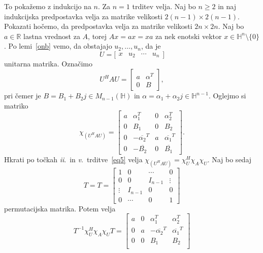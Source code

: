 \documentclass[mat1, tisk]{fmfdelo}
\numberwithin{equation}{section}
\begin{document}
\begin{dokaz}
    \medskip
    To pokažemo z indukcijo na $n$. Za $n = 1$ trditev velja. Naj bo $n \geq 2$ in naj indukcijska predpostavka velja za matrike velikosti $2(n-1) \times 2(n-1)$. Pokazati hočemo, da 
    predpostavka velja za matrike velikosti $2n \times 2n$. Naj bo $a \in \mathbb{R}$ lastna vrednost za $A$, torej
    $Ax = ax = xa$ za nek enotski vektor $x\in \mathbb{H}^n \setminus \{0\}$. Po lemi~\ref{onb} vemo, da obstajajo $u_2, \ldots , u_n$, da je
    $$U =
    \Bigg[\begin{matrix}
        x & u_2 & \cdots & u_n
    \end{matrix}\Bigg]
    $$
    unitarna matrika. Označimo
    $$U^H A U = 
    \begin{bmatrix}
        a & \alpha ^T \\
        0 & B
    \end{bmatrix},
    $$
    pri čemer je $B = B_1 + B_2 j \in M_{n-1}(\mathbb{H})$ in $\alpha = \alpha_1 + \alpha_2 j \in \mathbb{H}^{n-1}$. Oglejmo si matriko
    \begin{equation*}\tag{1}
        \chi_{(U^H A U)} =  
        \begin{bmatrix}
            a & \alpha_1^T & 0 & \alpha_2^T \\
            0 & B_1 & 0 & B_2 \\
            0 & - \overline{\alpha_2}^T & a & \overline{\alpha_1}^T \\
            0 & - \overline{B_2} & 0 & \overline{B_1}
        \end{bmatrix}.
    \end{equation*}
    Hkrati po točkah \textit{ii}.\ in \textit{v}.\ trditve~\ref{eq5} velja $\chi_{(U^H A U)} = \chi_{U}^{H}\chi_A \chi_{U}$. Naj bo sedaj
    $$T =
    T =
    \begin{bmatrix}
    1 & 0 & \cdots & 0 \\
    0 & 0 & I_{n-1} & \vdots \\
    \vdots & I_{n-1} & 0 & 0 \\
    0 & \cdots & 0 & 1
    \end{bmatrix}$$
    permutacijska matrika. Potem velja 
    \begin{equation}\tag{2}
            T^{-1} \chi_{U}^{H}\chi_A \chi_{U} T =  
        \begin{bmatrix}
            a & 0 & \alpha_1^T & \alpha_2^T \\
            0 & a & - \overline{\alpha_2}^T & \overline{\alpha_1}^T\\
            0 & 0 & B_1 & B_2  \\

\end{bmatrix}
\end{equation}
\end{dokaz}
\end{document}
